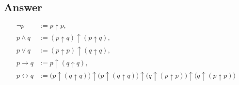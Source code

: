 \documentclass[12pt]{article}
\begin{document}
\begin{enumerate}[start=1,label={\bfseries Part \arabic*:},leftmargin=0in]
		\subsection*{Answer}
		
			\[\boxed{
				\begin{aligned}
					\lnot p				& := p \uparrow p, \\
					p \land q			& := (p \uparrow q) \uparrow (p \uparrow q), \\
					p \lor q			& := (p \uparrow p) \uparrow (q \uparrow q), \\
					p \to q				& := p \uparrow (q \uparrow q), \\
					p \leftrightarrow q	& := \Big( p \uparrow (q \uparrow q) \Big) \uparrow \Big( p \uparrow (q \uparrow q) \Big) \uparrow \Big( q \uparrow (p \uparrow p) \Big) \uparrow \Big( q \uparrow (p \uparrow p) \Big)
				\end{aligned}
			}\]
			
	\end{enumerate}
	
\end{document}
